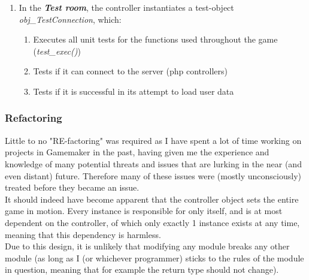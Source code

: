 \documentclass[12pt]{report}
\begin{document}
\begin{enumerate}
\item In the \emph{\textbf{Test room}}, the controller instantiates a test-object \emph{obj\_TestConnection}, which:
\begin{enumerate}
\item Executes all unit tests for the functions used throughout the game (\emph{test\_exec()})
\item Tests if it can connect to the server (php controllers)
\item Tests if it is successful in its attempt to load user data
\end{enumerate}
\end{enumerate}
\subsubsection{Refactoring}
Little to no "RE-factoring" was required as I have spent a lot of time working on projects in Gamemaker in the past, having given me the experience and knowledge of many potential threats and issues that are lurking in the near (and even distant) future. Therefore many of these issues were (mostly unconsciously) treated before they became an issue.\\
It should indeed have become apparent that the controller object sets the entire game in motion. Every instance is responsible for only itself, and is at most dependent on the controller, of which only exactly 1 instance exists at any time, meaning that this dependency is harmless.\\
Due to this design, it is unlikely that modifying any module breaks any other module (as long as I (or whichever programmer) sticks to the rules of the module in question, meaning that for example the return type should not change).\\
\end{document}
